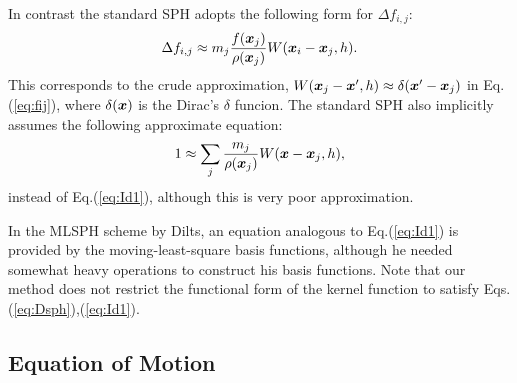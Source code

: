 \documentclass{cjour}
\newcommand{ \Vec   }[1]{ \mbox{\boldmath $ #1 $} }
\begin{document}
\begin{article}
In contrast the standard SPH adopts the following form 
for $\Delta f_{i,j}$: 
\begin{equation}
     \Delta f_{i,j} \approx
                m_j \frac{ f(\Vec{x}_j) }{\rho(\Vec{x}_j)} 
                W(\Vec{x}_i-\Vec{x}_j,h). 
                                                     \label{eq:fijSPH}
\end{equation}
This corresponds to the crude approximation, 
$W(\Vec{x}_j-\Vec{x}',h) \approx \delta(\Vec{x}'-\Vec{x}_j)$ 
in Eq.(\ref{eq:fij}), 
where $\delta(\Vec{x})$ is the Dirac's $\delta$ funcion.  
The standard SPH also implicitly assumes 
the following approximate equation: 
\begin{equation}
                 1 \approx \sum_{j} \frac{m_j}{\rho(\Vec{x}_j)} 
                                    W(\Vec{x} - \Vec{x}_{j} , h ), 
                                                     \label{eq:SPH1}
\end{equation}
instead of Eq.(\ref{eq:Id1}),    
although this is very poor approximation.  

%
%
%
In the MLSPH scheme by Dilts, an equation analogous to 
Eq.(\ref{eq:Id1}) is provided by 
the moving-least-square basis functions,    
although he needed somewhat heavy operations 
to construct his basis functions. 
Note that our method does not restrict the functional form of the 
kernel function to satisfy Eqs.(\ref{eq:Dsph}),(\ref{eq:Id1}).   
%
%
%
 \subsection{Equation of Motion}  
                                                 \label{sec:relation}


\end{article}
\end{document}
